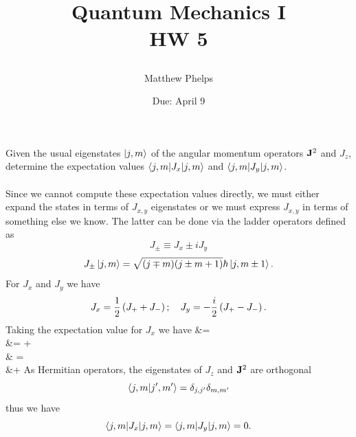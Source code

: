 \documentclass[11pt,letterpaper]{article}
\title{\begin{spacing}{1.2}Quantum Mechanics I\\HW 5\end{spacing}}
\author{Matthew Phelps}
\date{Due: April 9}
\begin{document}
\maketitle

\benum
  	\item 
	
	\benum
		\item 
		Given the usual eigenstates $\ket{j,m}$ of the angular momentum operators $\mathbf{J}^2$ and $J_z$, determine the expectation 
		values $\braket{j,m|J_x|j,m}$ and $\braket{j,m|J_y|j,m}$.
		\\ 
		\\
		Since we cannot compute these expectation values directly, we must either expand the states in terms of $J_{x,y}$ eigenstates
		or we must express $J_{x,y}$ in terms of something else we know. The latter can be done via the ladder operators defined as
		\[
			J_\pm \equiv J_x\pm iJ_y
		\]
		\[
			J_\pm \ket{j,m} = \sqrt{(j\mp m)(j\pm m+1)}\hbar\ket{j,m\pm 1}.
		\]
		For $J_x$ and $J_y$ we have
		\[
			J_x = \frac 12 \left(J_++J_-\right);\quad J_y  = -\frac{i}{2} \left(J_+-J_-\right).
		\]
		Taking the expectation value for $J_x$ we have 
		\ba
			 &=  \\
			&= +\\
			& = \\
			&\quad +
		\ea
		As Hermitian operators, the eigenstates of $J_z$ and $\mathbf{J}^2$ are orthogonal
		\[
			\braket{j,m|j',m'} = \delta_{j,j'}\delta_{m,m'}
		\]
		thus we have 
		\[
			\braket{j,m|J_x|j,m} = \braket{j,m|J_y|j,m} = 0.
		\]
		\\
		
\end{document}
